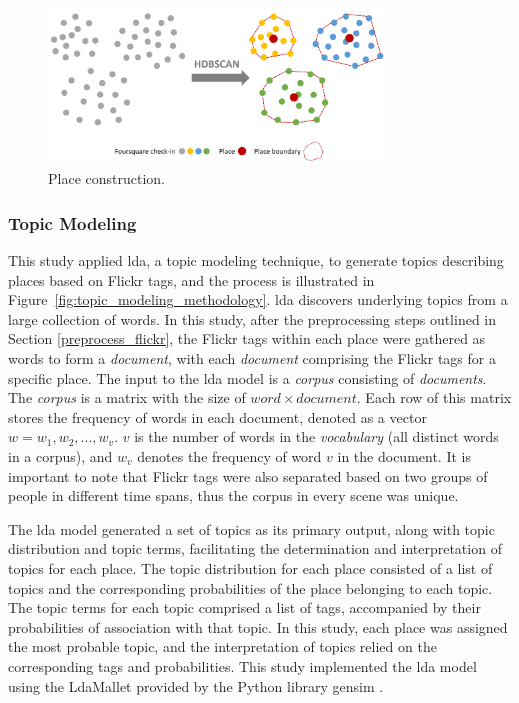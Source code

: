 \documentclass{article}
\theoremstyle{remark}
\begin{document}
\begin{figure} [!h]
\centering
\includegraphics[width=0.8\textwidth]{figures/place_construction_methodology.png}
\caption{\label{fig:place_construction_methodology}Place construction.}
\end{figure}

\subsubsection{Topic Modeling}

This study applied \acrfull{lda}, a topic modeling technique, to generate topics describing places based on Flickr tags, and the process is illustrated in Figure~\ref{fig:topic_modeling_methodology}. \acrshort{lda} discovers underlying topics from a large collection of words. In this study, after the preprocessing steps outlined in Section \ref{preprocess_flickr}, the Flickr tags within each place were gathered as words to form a \textit{document}, with each \textit{document} comprising the Flickr tags for a specific place. The input to the \acrshort{lda} model is a \textit{corpus} consisting of \textit{documents}. The \textit{corpus} is a matrix with the size of $word \times document$. Each row of this matrix stores the frequency of words in each document, denoted as a vector $w = {w_{1}, w_{2}, ..., w_{v}}$. $v$ is the number of words in the \textit{vocabulary} (all distinct words in a corpus), and $w_{v}$ denotes the frequency of word $v$ in the document. It is important to note that Flickr tags were also separated based on two groups of people in different time spans, thus the corpus in every scene was unique.

The \acrshort{lda} model generated a set of topics as its primary output, along with topic distribution and topic terms, facilitating the determination and interpretation of topics for each place. The topic distribution for each place consisted of a list of topics and the corresponding probabilities of the place belonging to each topic. The topic terms for each topic comprised a list of tags, accompanied by their probabilities of association with that topic. In this study, each place was assigned the most probable topic, and the interpretation of topics relied on the corresponding tags and probabilities. This study implemented the \acrshort{lda} model using the LdaMallet provided by the Python library gensim \citep{rehurek_software_2010}.
\end{document}
